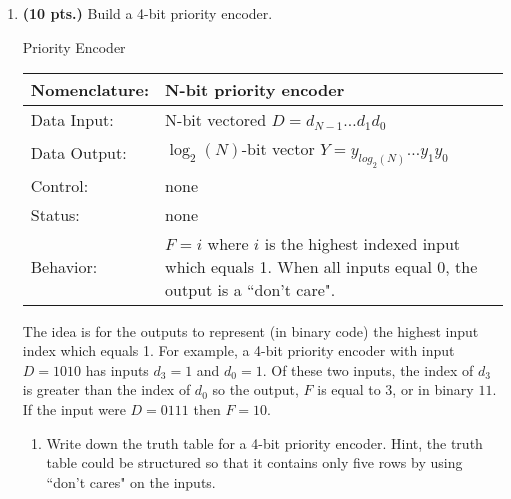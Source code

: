 \begin{enumerate}
\begin{enumerate}
                \end{enumerate}

            \item \textbf{ (10 pts.)} Build a 4-bit priority encoder.

                \begin{buildingblock}{Priority Encoder}
                    \begin{tabular}{|l|p{3.5in}|} \hline
                        Nomenclature:  & N-bit priority encoder                \\ \hline
                        Data Input:    & N-bit vectored  $D=d_{N-1} \ldots d_1 d_0$  \\ \hline
                        Data Output:   & $\log_2(N)$-bit vector $Y=y_{log_2(N)} \ldots y_1 y_0$    \\ \hline
                        Control:       & none                    \\ \hline
                        Status:        & none                                   \\ \hline
                        Behavior:      & $F = i$ where $i$ is the highest indexed input
                        which equals 1.  When all inputs equal
                        0, the output is a ``don't care".  \\ \hline
                    \end{tabular}
                    \label{page:prior}
                \end{buildingblock}

                The idea is for the outputs to represent (in binary code) the highest
                input index which equals 1.  For example, a 4-bit priority encoder
                with input $D=1010$ has inputs $d_3=1$ and $d_0=1$.  Of these two
                inputs, the index of $d_3$ is greater than the index of $d_0$ so the
                output, $F$ is equal to 3, or in binary $11$.  If the input were
                $D=0111$ then $F=10$.

                \begin{enumerate}
                    \item Write down the truth table for a 4-bit priority encoder.  Hint,
                        the truth table could be structured so that it contains only five rows
                        by using ``don't cares" on the inputs.


\end{enumerate}
\end{enumerate}
